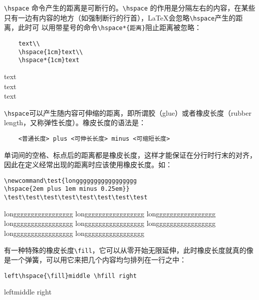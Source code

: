 \verb|\hspace| 命令产生的距离是可断行的。\verb|\hspace| 的作用是分隔左右的内容，在某些只有一边有内容的地方（如强制断行的行首），\LaTeX 会忽略\verb|\hspace|产生的距离，此时可
以用带星号的命令\verb|\hspace*{距离}|阻止距离被忽略：

\begin{minipage}[t]{0.45\textwidth}
\begin{lstlisting}
    text\\
    \hspace{1cm}text\\
    \hspace*{1cm}text
\end{lstlisting}
\end{minipage}
\hfill
\begin{minipage}[t]{0.45\textwidth}
    text\\
    \hspace{1cm}text\\
    \hspace*{1cm}text
\end{minipage}

\verb|\hspace|可以产生随内容可伸缩的距离，即所谓胶（glue）或者橡皮长度（rubber length，又称弹性长度）。橡皮长度的语法是：
\begin{lstlisting}
    <普通长度> plus <可伸长长度> minus <可缩短长度>
\end{lstlisting}

单词间的空格、标点后的距离都是橡皮长度，这样才能保证在分行时行末的对齐，因此在定义经常出现的距离时应该使用橡皮长度。如：

\begin{minipage}[t]{0.45\textwidth}
\begin{lstlisting}
\newcommand\test{longgggggggggggggggg
\hspace{2em plus 1em minus 0.25em}}
\test\test\test\test\test\test\test\test
\end{lstlisting}
\end{minipage}
\hfill
\begin{minipage}[t]{0.45\textwidth}
\newcommand\test{longgggggggggggggggg \hspace{2em plus 1em minus 0.25em}}
\test\test\test\test\test\test\test\test
\end{minipage}

有一种特殊的橡皮长度\verb|\fill|，它可以从零开始无限延伸，此时橡皮长度就真的像是一个弹簧，可以用它来把几个内容均匀排列在一行之中：

\begin{minipage}[t]{0.45\textwidth}
\begin{lstlisting}
left\hspace{\fill}middle \hfill right
\end{lstlisting}
\end{minipage}
\hfill
\begin{minipage}[t]{0.45\textwidth}
    left\hspace{\fill}middle \hfill right
\end{minipage}

